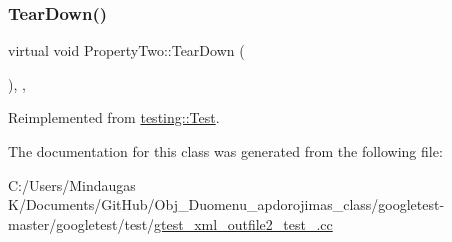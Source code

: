 \subsubsection{\texorpdfstring{TearDown()}{TearDown()}\hspace{0.1cm}{\footnotesize\ttfamily [3/3]}}
{\footnotesize\ttfamily virtual void Property\+Two\+::\+Tear\+Down (\begin{DoxyParamCaption}{ }\end{DoxyParamCaption})\hspace{0.3cm}{\ttfamily [inline]}, {\ttfamily [protected]}, {\ttfamily [virtual]}}



Reimplemented from \mbox{\hyperlink{classtesting_1_1_test_a5f0ab439802cbe0ef7552f1a9f791923}{testing\+::\+Test}}.



The documentation for this class was generated from the following file\+:\begin{DoxyCompactItemize}
\item 
C\+:/\+Users/\+Mindaugas K/\+Documents/\+Git\+Hub/\+Obj\+\_\+\+Duomenu\+\_\+apdorojimas\+\_\+class/googletest-\/master/googletest/test/\mbox{\hyperlink{googletest-master_2googletest_2test_2gtest__xml__outfile2__test___8cc}{gtest\+\_\+xml\+\_\+outfile2\+\_\+test\+\_\+.\+cc}}\end{DoxyCompactItemize}
